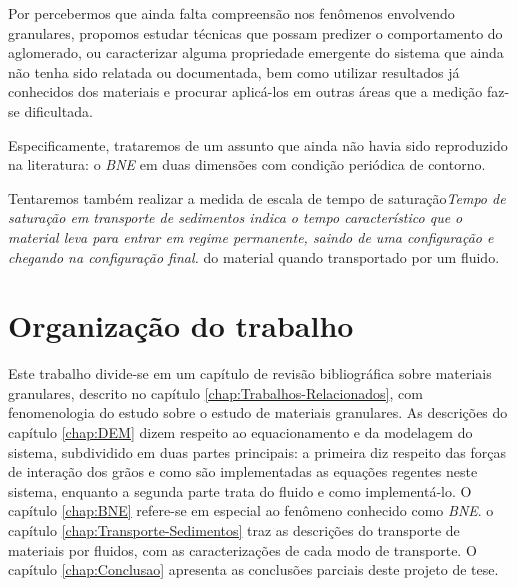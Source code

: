     Por percebermos que ainda falta compreensão nos fenômenos envolvendo granulares, propomos estudar técnicas que possam predizer o comportamento do aglomerado, ou caracterizar alguma propriedade emergente do sistema que ainda não tenha sido relatada ou documentada, bem como utilizar resultados já conhecidos dos materiais e procurar aplicá-los em outras áreas que a medição faz-se dificultada.
    
    Especificamente, trataremos de um assunto que ainda não havia sido reproduzido na literatura: o \textit{BNE} em duas dimensões com condição periódica de contorno.

    Tentaremos também realizar a medida de escala de tempo de saturação\textit{Tempo de saturação em transporte de sedimentos indica o tempo característico que o material leva para entrar em regime permanente, saindo de uma configuração e chegando na configuração final.} do material quando transportado por um fluido.

\section{Organização do trabalho}
\label{sec:organizacaoTrabalho}

    Este trabalho divide-se em um capítulo de revisão bibliográfica sobre materiais granulares, descrito no capítulo \ref{chap:Trabalhos-Relacionados}, com fenomenologia do estudo sobre o estudo de materiais granulares. As descrições do capítulo \ref{chap:DEM} dizem respeito ao equacionamento e da modelagem do sistema, subdividido em duas partes principais: a primeira diz respeito das forças de interação dos grãos e como são implementadas as equações regentes neste sistema, enquanto a segunda parte trata do fluido e como implementá-lo. O capítulo \ref{chap:BNE} refere-se em especial ao fenômeno conhecido como \textit{BNE}. o capítulo \ref{chap:Transporte-Sedimentos} traz as descrições do transporte de materiais por fluidos, com as caracterizações de cada modo de transporte. O capítulo \ref{chap:Conclusao} apresenta as conclusões parciais deste projeto de tese.



